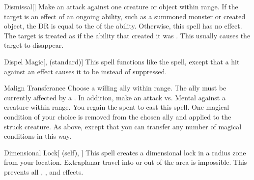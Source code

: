 \lowercase{\hypertarget{spell:Dismissal}{}}\label{spell:Dismissal}
\begin{apability}[\nth{2}]{\hypertarget{spell:Dismissal}{Dismissal}}[]
Make an attack against one creature or object within \rngmed range.
If the target is an effect of an ongoing  ability, such as a summoned monster or created object, the DR is equal to the  of the ability.
Otherwise, this spell has no effect.
\hit The target is treated as if the ability that created it was .
This usually causes the target to disappear.
\end{apability}
\vspace{0.25em}



\lowercase{\hypertarget{spell:Dispel Magic}{}}\label{spell:Dispel Magic}
\begin{apability}[\nth{2}]{\hypertarget{spell:Dispel Magic}{Dispel Magic}}[,  (standard)]
This spell functions like the  spell, except that a hit against an effect causes it to be  instead of suppressed.
\end{apability}
\vspace{0.25em}



\lowercase{\hypertarget{spell:Malign Transferance}{}}\label{spell:Malign Transferance}
\begin{apability}[\nth{2}]{\hypertarget{spell:Malign Transferance}{Malign Transferance}}
Choose a willing ally within \rngmed range.
The ally must be currently affected by a  .
In addition, make an attack vs. Mental against a creature within \rngmed range.
\miss You regain the  spent to cast this spell.
\hit One magical condition of your choice is removed from the chosen ally and applied to the struck creature.
\crit As above, except that you can transfer any number of magical conditions in this way.
\end{apability}
\vspace{0.25em}



\lowercase{\hypertarget{spell:Dimensional Lock}{}}\label{spell:Dimensional Lock}
\begin{attuneability}[\nth{4}]{\hypertarget{spell:Dimensional Lock}{Dimensional Lock}}[ (self), ]
This spell creates a dimensional lock in a \arealarge radius zone from your location.
Extraplanar travel into or out of the area is impossible.
This prevents all , , and  effects.
\end{attuneability}
\vspace{0.25em}



